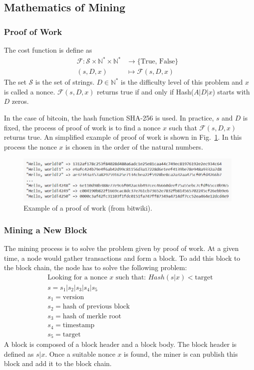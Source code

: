 \documentclass[12pt,a4paper]{article}
\begin{document}
\subsection{Mathematics of Mining}
\subsubsection{Proof of Work}
The cost function is define as 
\begin{align*}
\mathcal{F}: \mathcal{S}\times \mathbb{N}^* \times \mathbb{N}^* &\longrightarrow \{\text{True, False}\}\\
(s, D, x)&\longmapsto \mathcal{F}(s, D, x)
\end{align*}
The set $\mathcal{S}$ is the set of strings. $D \in \mathbb{N}^*$ is the difficulty level of this problem and $x$ is called a nonce. $\mathcal{F}(s, D, x)$ returns true if and only if Hash($A|D|x$) starts with $D$ zeros. 


In the case of bitcoin, the hash function SHA-256 is used. In practice, $s$ and $D$ is fixed, the process of proof of work is to find a nonce $x$ such that $\mathcal{F}(s, D, x)$ returns true. An  simplified example of proof of work is shown in Fig.~\ref{fig:hash}. In this process the nonce $x$ is chosen in the order of the natural numbers.

\begin{figure}[tbph!]
	\centering
	\includegraphics[width=0.9\linewidth]{Hash}
	\caption{Example of a proof of work (from bitwiki).}
	\label{fig:hash}
\end{figure}

\subsubsection{Mining a New Block}
The mining process is to solve the problem given by proof of work. At a given time, a node would gather transactions and form a block. To add this block to the block chain, the node has to solve the following problem:
\begin{align*}
&\text{Looking for a nonce $x$ such that: } Hash(s|x) < \text{target}\\
&s = s_1 | s_2 | s_3 | s_4 | s_5\\
&s_1 = \text{version}\\
&s_2 = \text{hash of previous block}\\
&s_3 = \text{hash of merkle root}\\
&s_4 = \text{timestamp }\\
&s_5 = \text{target}
\end{align*}
A block is composed of a block header and a block body. The block header is defined as $s|x$. Once a suitable nonce $x$ is found, the miner is can publish this block and add it to the block chain.
\end{document}

